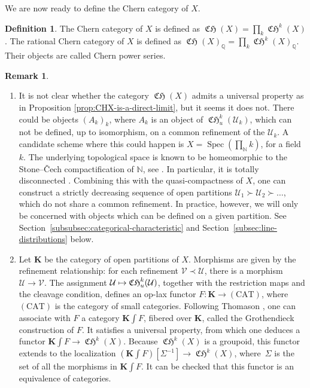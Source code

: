 \documentclass[11pt]{article}
\newcommand{\skpt}{\smallskip}
\newcommand\mto{\mathchoice{\longmapsto}{\mapsto}{\mapsto}{\mapsto}}
\theoremstyle{plain}
\theoremstyle{definition}
\newtheorem{definition}[theorem]{Definition}
\newtheorem{remark}[theorem]{Remark}
\newcommand{\Kbold}{\mathbf{K}}
\newcommand{\NBbb}{\mathbb N}
\newcommand{\QBbb}{\mathbb Q}
\newcommand{\Ucal}{\mathcal U}
\newcommand{\Vcal}{\mathcal V}
\DeclareMathOperator{\CHfrak}{\mathfrak{CH}}
\DeclareMathOperator{\Spec}{Spec}
\begin{document}
We are now ready to define the Chern category of $X$.

\begin{definition}
The Chern category of $X$ is defined as $\CHfrak(X)=\prod_{k}\CHfrak^{k}(X)$. The rational Chern category of $X$ is defined as $\CHfrak(X)_{\QBbb}=\prod_{k}\CHfrak^{k}(X)_{\QBbb}$. Their objects are called Chern power series.
\end{definition}

\skpt
\begin{remark}\label{rmk:Grothendieck-construction}
\begin{enumerate}
\item\label{item:Grothendieck-construction-1} It is not clear whether the category $\CHfrak(X)$ admits a universal property as in Proposition \ref{prop:CHX-is-a-direct-limit}, but it seems it does not. There could be objects $(A_{k})_{k}$, where $A_{k}$ is an object of $\CHfrak^{k}_{u}(\Ucal_{k})$, which can not be defined, up to isomorphism, on a common refinement of the $\Ucal_{k}$. A candidate scheme where this could happen is $X=\Spec(\prod_{\NBbb}k)$, for a field $k$. The underlying topological space is known to be homeomorphic to the Stone--\v{C}ech compactification of $\NBbb$, see \cite[Ex.\,G, Chap.\,II]{Mumford-red}. In particular, it is totally disconnected \cite[\href{https://stacks.math.columbia.edu/tag/090C}{090C}]{stacks-project}. Combining this with the quasi-compactness of $X$, one can construct a strictly decreasing sequence of open partitions $\Ucal_{1}\succ\Ucal_{2}\succ\ldots$, which do not share a common refinement. In practice, however, we will only be concerned with objects which can be defined on a given partition. See Section~\ref{subsubsec:categorical-characteristic} and Section~\ref{subsec:line-distributions} below.
\item Let $\Kbold$ be the category of open partitions of $X$. Morphisms are given by the refinement relationship: for each refinement $\Vcal\prec\Ucal$, there is a morphism $\Ucal\to\Vcal$. The assignment $\Ucal\mto\CHfrak_{u}^{k}(\Ucal)$, together with the restriction maps and the cleavage condition, defines an op-lax functor $F\colon \Kbold\to\mathrm{(CAT)}$, where $\mathrm{(CAT)}$ is the category of small categories. Following Thomason \cite[\S 3]{ThomasonHomCol}, one can associate with $F$ a category $\Kbold\int F$, fibered over $\Kbold$, called the Grothendieck construction of $F$. It satisfies a universal property, from which one deduces a functor $\Kbold\int F\to\CHfrak^{k}(X)$. Because $\CHfrak^{k}(X)$ is a groupoid, this functor extends to the localization $(\Kbold\int F)[\Sigma^{-1}]\to\CHfrak^{k}(X)$, where~$\Sigma$ is the set of all the morphisms in $\Kbold\int F$. It can be checked that this functor is an equivalence of categories.
\end{enumerate}
\end{remark}
\end{document}
